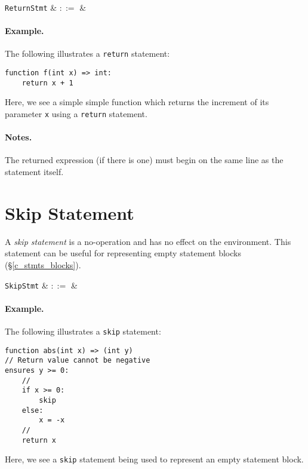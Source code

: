 \begin{syntax}
  \verb+ReturnStmt+ & $::=$ & \ \\
\end{syntax}

\paragraph{Example.} The following illustrates a \lstinline{return} statement:

\begin{lstlisting}
function f(int x) => int:
    return x + 1
\end{lstlisting}
Here, we see a simple simple function which returns the increment of its parameter \lstinline{x} using a \lstinline{return} statement.


\paragraph{Notes.} The returned expression (if there is one) must begin on the same line as the statement itself.


\section{Skip Statement}
\label{c_stmts_skip}
A {\em skip statement} is a no-operation and has no effect on the environment.  This statement can be useful for representing empty statement blocks (\S\ref{c_stmts_blocks}).

\begin{syntax}
  \verb+SkipStmt+ & $::=$ & \\
\end{syntax}

\paragraph{Example.} The following illustrates a \lstinline{skip} statement:

\begin{lstlisting}
function abs(int x) => (int y)
// Return value cannot be negative
ensures y >= 0:
    //
    if x >= 0:
        skip
    else:
        x = -x
    //
    return x
\end{lstlisting}
Here, we see a \lstinline{skip} statement being used to represent an empty statement block.  

